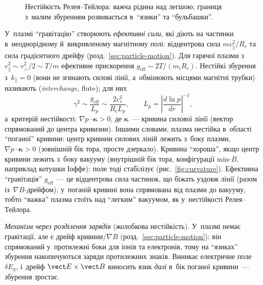 \begin{figure}[ht]
\centering
{}
\caption{Нестійкість Релея--Тейлора: важча рідина над легшою; границя з~малим збуренням
розвивається в~\enquote{язики} та \enquote{бульбашки}.}
\label{fig:rayleigh-taylor}
\end{figure}

У~плазмі \enquote{гравітацію} створюють \emph{ефективні сили}, які діють на частинки в~неоднорідному
й~викривленому магнітному полі: відцентрова сила $mv_\parallel^2/R_c$ та сила градієнтного
дрейфу (розд.~\ref{sec:particle-motion}). Для гарячої плазми з~$v_\parallel^2\sim v_\perp^2/2\sim T/m$
ефективне прискорення $g_\mathrm{eff}\sim2T/(m_iR_c)$. Нестійкі збурення з~$k_\parallel=0$
(вони не згинають силові лінії, а~обмінюють місцями магнітні трубки) називають
 (\emph{interchange}, flute); для них
\begin{equation}\label{eq:interchange-growth}
	\gamma^2\sim\frac{g_\mathrm{eff}}{L_p}\sim\frac{2c_s^2}{R_cL_p},\qquad L_p=\left|\frac{d\ln p}{dr}\right|^{-1},
\end{equation}
а~критерій нестійкості: $\nabla p\cdot\boldsymbol\kappa>0$, де $\boldsymbol\kappa$~--- кривина силової
лінії (вектор спрямований до центра кривизни). Іншими словами, плазма нестійка в~області \enquote{поганої}
кривини: центр кривини силових ліній лежить з~боку плазми, $\nabla p\cdot\boldsymbol\kappa>0$ (зовнішній
бік тора, просте дзеркало). Кривина \enquote{хороша}, якщо центр кривини лежить з~боку вакууму
(внутрішній бік тора, конфігурації min-$B$, наприклад котушки Іоффе): поле тоді стабілізує
(рис.~\ref{fig:curvature}). Ефективна \enquote{гравітація} $g_\mathrm{eff}$~--- це відцентрова сила частинок,
що біжать уздовж лінії (разом із~$\nabla B$-дрейфом); у~поганій кривині вона спрямована від плазми до вакууму, тобто \enquote{важка} плазма стоїть над \enquote{легким} вакуумом, як у~нестійкості Релея--Тейлора.

\emph{Механізм через розділення зарядів} (жолобкова нестійкість). У~плазмі немає гравітації, але є дрейф кривини/$\nabla B$ (розд.~\ref{sec:particle-motion}):
він спрямований у~протилежні боки для іонів та електронів, тому на \enquote{язиках} збурення накопичуються заряди протилежних знаків.
Виникає електричне поле $\delta E_y$, і~дрейф $\vect E\times\vect B$ виносить язик \emph{далі} в~бік поганої кривини~--- збурення зростає.

